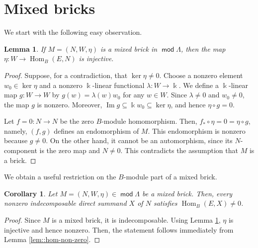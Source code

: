 \documentclass[a4,12pt]{amsart}
\numberwithin{equation}{section} %
\def\Hom{\operatorname{Hom}} %
\def\Im{\operatorname{Im}} %
\def\mod{\operatorname{\mathsf{mod}}}
\newtheorem{corollary}[theorem]{Corollary} %
\newtheorem{lemma}[theorem]{Lemma} %
\theoremstyle{definition} %
\begin{document}
\section{Mixed bricks}\label{Section-3}
We start with the following easy observation.
\begin{lemma}\label{lem:eta-injective}
If $M=(N,W,\eta)$ is a mixed brick in $\mod \Lambda$, then the map $\eta\colon W\to \Hom_B(E,N)$ is injective. 
\end{lemma}
\begin{proof}
Suppose, for a contradiction, that $\ker\eta\neq 0$. Choose a nonzero element $w_0\in\ker\eta$ and a nonzero $\Bbbk$-linear functional $\lambda\colon W\to\Bbbk$. We define a $\Bbbk$-linear map $g\colon W\to W$ by $g(w)=\lambda(w)w_0$ for any $w\in W$. Since $\lambda\neq 0$ and $w_0\neq 0$, the map $g$ is nonzero. Moreover, $\Im g\subseteq \Bbbk w_0\subseteq\ker\eta$, and hence $\eta\circ g=0$.
 
Let $f=0\colon N\to N$ be the zero $B$-module homomorphism. Then, $f_*\circ\eta=0=\eta\circ g$, namely, $(f,g)$ defines an endomorphism of $M$. This endomorphism is nonzero because $g\neq 0$. On the other hand, it cannot be an automorphism, since its $N$-component is the zero map and $N\neq 0$. This contradicts the assumption that $M$ is a brick.
\end{proof}

We obtain a useful restriction on the $B$-module part of a mixed brick. 
\begin{corollary}\label{cor::mixed-brick-summand}
Let $M=(N,W,\eta)\in\mod \Lambda$ be a mixed brick. Then, every nonzero indecomposable direct summand $X$ of $N$ satisfies $\Hom_B(E,X)\neq 0$. 
\end{corollary}
\begin{proof}
Since $M$ is a mixed brick, it is indecomposable. Using Lemma \ref{lem:eta-injective}, $\eta$ is injective and hence nonzero. Then, the statement follows immediately from Lemma \ref{lem::hom-non-zero}.
\end{proof}
\end{document}

